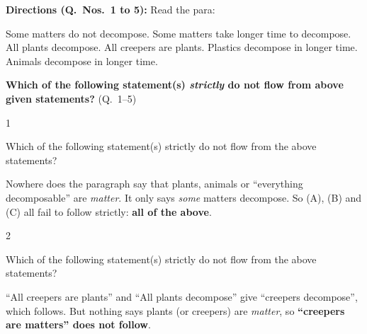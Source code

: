 \begin{context}
\textbf{Directions (Q.~Nos.~1 to 5):} Read the para:\par\smallskip
Some matters do not decompose. Some matters take longer time to decompose. All plants decompose. All creepers are plants. Plastics decompose in longer time. Animals decompose in longer time.\par\smallskip
\textbf{Which of the following statement(s) \emph{strictly} do not flow from above given statements?} (Q.~1--5)
\end{context}
\begin{question}{1}
{Which of the following statement(s) strictly do not flow from the above statements?\par}
\begin{explain}
Nowhere does the paragraph say that plants, animals or ``everything decomposable'' are \emph{matter}. It only says \emph{some} matters decompose. So (A), (B) and (C) all fail to follow strictly: \textbf{all of the above}.
\end{explain}
\end{question}

\begin{question}{2}
{Which of the following statement(s) strictly do not flow from the above statements?\par}
\begin{explain}
``All creepers are plants'' and ``All plants decompose'' give ``creepers decompose'', which follows. But nothing says plants (or creepers) are \emph{matter}, so \textbf{``creepers are matters'' does not follow}.
\end{explain}
\end{question}

